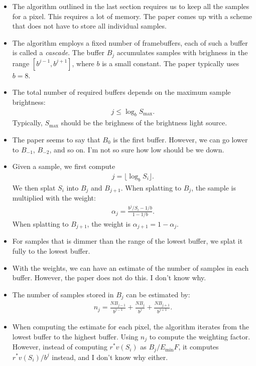 \documentclass[10pt]{article}
\begin{document}
  \begin{itemize}
  	\item The algorithm outlined in the last section requires us to keep all the samples for a pixel. This requires a lot of memory. The paper comes up with a scheme that does not have to store all individual samples.

  	\item The algorithm employs a fixed number of framebuffers, each of such a buffer is called a \emph{cascade}. The buffer $B_j$ accumulates samples with brighness in the range $[b^{j-1}, b^{j+1}]$, where $b$ is a small constant. The paper typically uses $b = 8$.

  	\item The total number of required buffers depends on the maximum sample brightness:
  	\begin{align*}
  		j \leq \log_b S_{\max}.
  	\end{align*}
  	Typically, $S_{\max}$ should be the brighness of the brightness light source.

  	\item The paper seems to say that $B_0$ is the first buffer. However, we can go lower to $B_{-1}$, $B_{-2}$, and so on. I'm not so sure how low should be we down.

  	\item Given a sample, we first compute
  	\begin{align*}
  		j = \lfloor \log_b S_i \rfloor.
  	\end{align*}
  	We then splat $S_i$ into $B_j$ and $B_{j+1}$. When splatting to $B_j$, the sample is multiplied with the weight:
  	\begin{align*}
  		\alpha_j = \frac{b^j /S_i - 1/b}{1 - 1/b}.
  	\end{align*}
  	When splatting to $B_{j+1}$, the weight is $\alpha_{j+1} = 1 - \alpha_j$.

  	\item For samples that is dimmer than the range of the lowest buffer, we splat it fully to the lowest buffer.

  	\item With the weights, we can have an estimate of the number of samples in each buffer. However, the paper does not do this. I don't know why.

  	\item The number of samples stored in $B_j$ can be estimated by:
  	\begin{align*}
  		n_j = \frac{N B_{j-1}}{b^{j-1}} + \frac{N B_j}{b^j} + \frac{N B_{j+1}}{b^{j+1}}.
  	\end{align*}

  	\item When computing the estimate for each pixel, the algorithm iterates from the lowest buffer to the highest buffer. Using $n_j$ to compute the weighting factor. However, instead of computing $r^*v(S_i)$ as $B_j/E_{\min}{F}$, it computes $r^*v(S_i)/b^j$ instead, and I don't know why either.

  \end{itemize}
\end{document}
